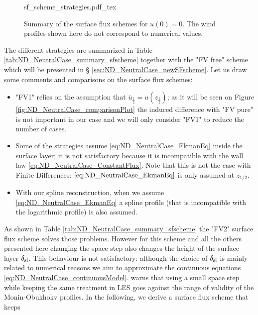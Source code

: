 \begin{figure}
	\centering
	{sf_scheme_strategies.pdf_tex}
	\caption{Summary of the surface flux schemes for $u(0)=0$.
	The wind profiles shown here do not correspond to
	numerical values.}
	\label{fig:ND_NeutralCase_summary_sfscheme}
\end{figure}
The different strategies are summarized in Table
\ref{tab:ND_NeutralCase_summary_sfscheme} together with the
"FV free" scheme which will be presented in \S
\ref{sec:ND_NeutralCase_newSFscheme}.
Let us draw some comments and comparisons on the surface flux schemes:
\begin{itemize}
	\item "FV1" relies on the assumption that
		$\overline{u}_{\frac{1}{2}} = u(z_{\frac{1}{2}})$;
		as it will be seen on Figure
		\ref{fig:ND_NeutralCase_comparisonPlot} the
		induced difference with "FV pure" is not important
		in our case and we will only consider "FV1" to
		reduce the number of cases.
	\item Some of the strategies assume
		\eqref{eq:ND_NeutralCase_EkmanEq} inside the surface
		layer; it is not satisfactory because it is
		incompatible with the wall law
		\eqref{eq:ND_NeutralCase_ConstantFlux}.
		Note that this is not
		the case with Finite Differences:
		$\eqref{eq:ND_NeutralCase_EkmanEq}$ is only assumed
		at $z_{1/2}$.
	\item With our spline reconstruction, when we assume
		\eqref{eq:ND_NeutralCase_EkmanEq} a spline
		profile (that is incompatible
		with the logarithmic profile) is also assumed.
\end{itemize}
As shown in Table \ref{tab:ND_NeutralCase_summary_sfscheme}
the "FV2" surface flux scheme solves those problems.
However for this scheme and all the others presented here
changing the space step
also changes the height of the surface layer $\delta_{\rm sl}$.
This behaviour is not satisfactory: although
the choice of $\delta_{\rm sl}$ is mainly related to numerical
reasons we aim to approximate the continuous equations
\eqref{eq:ND_NeutralCase_continuousModel}.
\cite{basu_cautionary_2017} warns that using a small space step
while keeping the same treatment in LES goes against the
range of validity of the Monin-Obukhokv profiles.
In the following, we derive a surface flux scheme that keeps
